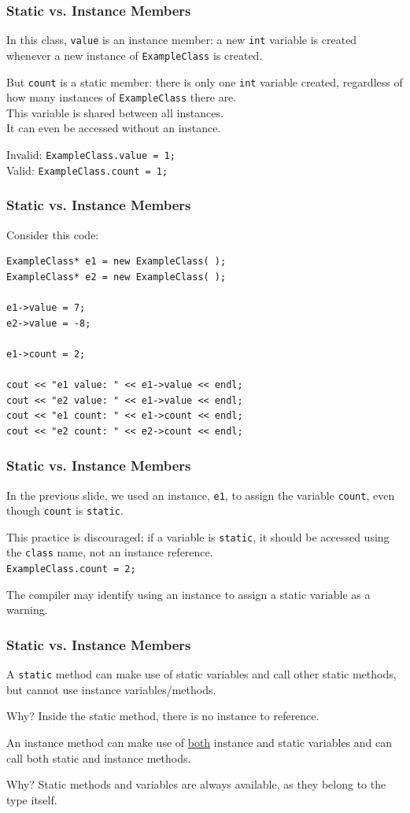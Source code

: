 \begin{frame}
\frametitle{Static vs. Instance Members}

In this class, \texttt{value} is an instance member: a new \texttt{int} variable is created whenever a new instance of \texttt{ExampleClass} is created.

But \texttt{count} is a static member: there is only one \texttt{int} variable created, regardless of how many instances of \texttt{ExampleClass} there are.\\
\quad This variable is shared between all instances.\\
\quad It can even be accessed without an instance.

Invalid: \texttt{ExampleClass.value = 1;}\\
Valid: \texttt{ExampleClass.count = 1;}

\end{frame}

\begin{frame}[fragile]
\frametitle{Static vs. Instance Members}
Consider this code:

\begin{verbatim}
ExampleClass* e1 = new ExampleClass( );
ExampleClass* e2 = new ExampleClass( );

e1->value = 7;
e2->value = -8;

e1->count = 2;

cout << "e1 value: " << e1->value << endl;
cout << "e2 value: " << e1->value << endl;
cout << "e1 count: " << e1->count << endl;
cout << "e2 count: " << e2->count << endl;
\end{verbatim}

\end{frame}

\begin{frame}
\frametitle{Static vs. Instance Members}
In the previous slide, we used an instance, \texttt{e1}, to assign the variable \texttt{count}, even though \texttt{count} is \texttt{static}.

This practice is discouraged; if a variable is \texttt{static}, it should be accessed using the \texttt{class} name, not an instance reference.\\
\quad \texttt{ExampleClass.count = 2;}

The compiler may identify using an instance to assign a static variable as a warning.

\end{frame}


\begin{frame}
\frametitle{Static vs. Instance Members}

A \texttt{static} method can make use of static variables and call other static methods, but cannot use instance variables/methods.

Why? Inside the static method, there is no instance to reference.

An instance method can make use of \underline{both} instance and static variables and can call both static and instance methods.

Why? Static methods and variables are always available, as they belong to the type itself.

\end{frame}

